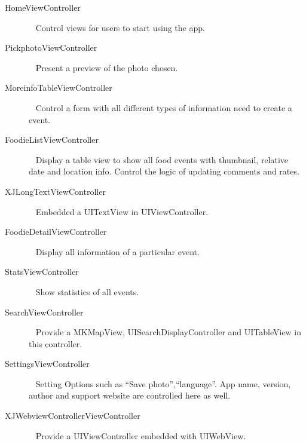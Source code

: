 \begin{description}
	\item[HomeViewController] \ \hfill 
	Control views for users to start using the app.
	\item[PickphotoViewController] \ \hfill
	Present a preview of the photo chosen.
	\item[MoreinfoTableViewController] \ \hfill
	Control a form with all different types of information need to create a event.
	\item[FoodieListViewController] \ \hfill
	Display a table view to show all food events with thumbnail, relative date and location info. Control the logic of updating comments and rates.
	\item[XJLongTextViewController] \ \hfill
	Embedded a UITextView in UIViewController.
	\item[FoodieDetailViewController] \ \hfill
	Display all information of a particular event.
	\item[StatsViewController] \ \hfill
	Show statistics of all events.
	\item[SearchViewController] \ \hfill
	Provide a MKMapView, UISearchDisplayController and UITableView in this controller. 
	\item[SettingsViewController] \ \hfill
	Setting Options such as ``Save photo'',``language''. App name, version, author and support website are controlled here as well.
	\item[XJWebviewControllerViewController] \ \hfill
	Provide a UIViewController embedded with UIWebView.
\end{description}


